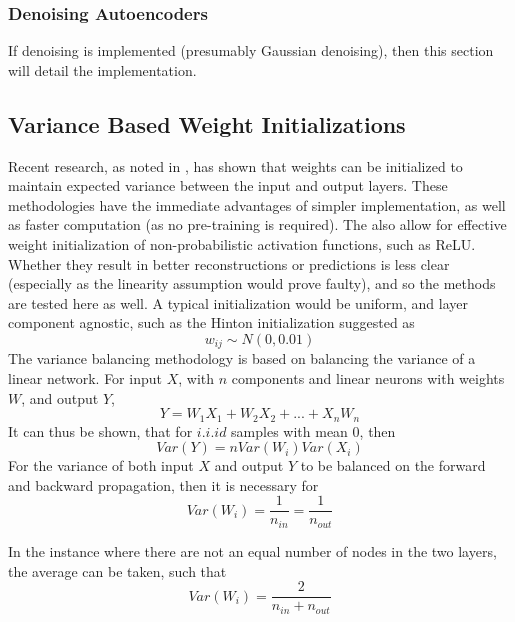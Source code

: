 \documentclass[a4paper,latin]{paper}
\begin{document}
\subsubsection{Denoising Autoencoders}

If denoising is implemented (presumably Gaussian denoising), then this section will detail the implementation. 

\subsection{Variance Based Weight Initializations}\label{imp_weights}

Recent research, as noted in , has shown that weights can be initialized to maintain expected variance between the input and output layers. These methodologies have the immediate advantages of simpler implementation, as well as faster computation (as no pre-training is required). The also allow for effective weight initialization of non-probabilistic activation functions, such as ReLU. Whether they result in better reconstructions or predictions is less clear (especially as the linearity assumption would prove faulty), and so the methods are tested here as well. 
\newline\newline
A typical initialization would be uniform, and layer component agnostic, such as the  Hinton initialization suggested as
\begin{equation}
w_{ij} \sim N(0, 0.01)
\end{equation}
The variance balancing methodology is based on balancing the variance of a linear network. For input $X$, with $n$ components and linear neurons with weights $W$, and output $Y$,
\begin{equation}
Y = W_1X_1 + W_2X_2 + ... + X_nW_n
\end{equation}
It can thus be shown, that for $i.i.id$ samples with mean $0$, then
\begin{equation}
Var(Y) = nVar(W_i)Var(X_i)
\end{equation}
For the variance of both input $X$ and output $Y$ to be balanced on the forward and backward propagation, then it is necessary for
\begin{equation}
Var(W_i) = \frac{1}{n_{in}}= \frac{1}{n_{out}}
\end{equation}

In the instance where there are not an equal number of nodes in the two layers, the average can be taken, such that
 \begin{equation}
Var(W_i) = \frac{2}{n_{in} + n_{out}}
\end{equation}
\end{document}
